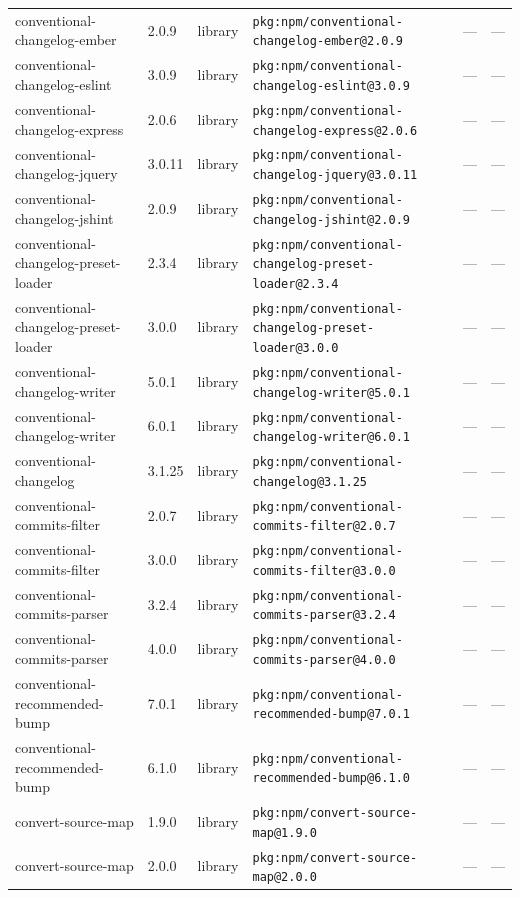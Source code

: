 \documentclass[11pt]{article}
\begin{document}
\begin{longtable}{|l|l|l|p{2.2cm}|l|p{4cm}|}
conventional-changelog-ember & 2.0.9 & library & \texttt{pkg:npm/conventional-changelog-ember@2.0.9} & — & — \\
conventional-changelog-eslint & 3.0.9 & library & \texttt{pkg:npm/conventional-changelog-eslint@3.0.9} & — & — \\
conventional-changelog-express & 2.0.6 & library & \texttt{pkg:npm/conventional-changelog-express@2.0.6} & — & — \\
conventional-changelog-jquery & 3.0.11 & library & \texttt{pkg:npm/conventional-changelog-jquery@3.0.11} & — & — \\
conventional-changelog-jshint & 2.0.9 & library & \texttt{pkg:npm/conventional-changelog-jshint@2.0.9} & — & — \\
conventional-changelog-preset-loader & 2.3.4 & library & \texttt{pkg:npm/conventional-changelog-preset-loader@2.3.4} & — & — \\
conventional-changelog-preset-loader & 3.0.0 & library & \texttt{pkg:npm/conventional-changelog-preset-loader@3.0.0} & — & — \\
conventional-changelog-writer & 5.0.1 & library & \texttt{pkg:npm/conventional-changelog-writer@5.0.1} & — & — \\
conventional-changelog-writer & 6.0.1 & library & \texttt{pkg:npm/conventional-changelog-writer@6.0.1} & — & — \\
conventional-changelog & 3.1.25 & library & \texttt{pkg:npm/conventional-changelog@3.1.25} & — & — \\
conventional-commits-filter & 2.0.7 & library & \texttt{pkg:npm/conventional-commits-filter@2.0.7} & — & — \\
conventional-commits-filter & 3.0.0 & library & \texttt{pkg:npm/conventional-commits-filter@3.0.0} & — & — \\
conventional-commits-parser & 3.2.4 & library & \texttt{pkg:npm/conventional-commits-parser@3.2.4} & — & — \\
conventional-commits-parser & 4.0.0 & library & \texttt{pkg:npm/conventional-commits-parser@4.0.0} & — & — \\
conventional-recommended-bump & 7.0.1 & library & \texttt{pkg:npm/conventional-recommended-bump@7.0.1} & — & — \\
conventional-recommended-bump & 6.1.0 & library & \texttt{pkg:npm/conventional-recommended-bump@6.1.0} & — & — \\
convert-source-map & 1.9.0 & library & \texttt{pkg:npm/convert-source-map@1.9.0} & — & — \\
convert-source-map & 2.0.0 & library & \texttt{pkg:npm/convert-source-map@2.0.0} & — & — \\

\end{longtable}
\end{document}
